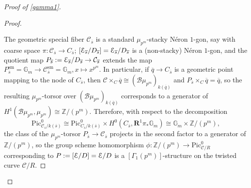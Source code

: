 \documentclass[11pt]{amsart}
\theoremstyle{definition}
\begin{document}
\begin{proof}[Proof of \ref{gamma1}]
\begin{proof}
\begin{center}
\end{center}
The geometric special fiber ${\mathcal{C}}_{\overline{s}}$ is a standard $\mu_{p^m}$-stacky N\'eron $1$-gon, say with coarse space $\pi: {\mathcal{C}}_{\overline{s}} \rightarrow C_{\overline{s}}$; $[{\mathbf{\EuScript{E}}}_{\overline{s}}/D_{\overline{s}}] = {\mathbf{\EuScript{E}}}_{\overline{s}} /D_{\overline{s}}$ is a (non-stacky) N\'eron $1$-gon, and the quotient map $P_{\overline{s}} := {\mathbf{\EuScript{E}}}_{\overline{s}} /D_{\overline{s}} \rightarrow {\mathcal{C}}_{\overline{s}}$ extends the map $P_{\overline{s}}^{\mathrm{sm}} = \mathbb{G}_m \rightarrow {\mathcal{C}}_{\overline{s}}^{\mathrm{sm}} = \mathbb{G}_m,x\mapsto x^{p^m}$. In particular, if $\overline{q} \rightarrow C_{\overline{s}}$ is a geometric point mapping to the node of $C_{\overline{s}}$, then ${\mathcal{C}}\times_C \overline{q} \cong ({\mathcal{B}}\mu_{p^m})_{k(\overline{q})}$ and $P_{\overline{s}}\times_C \overline{q} = \overline{q}$, so the resulting $\mu_{p^m}$-torsor over $({\mathcal{B}}\mu_{p^m})_{k(\overline{q})}$ corresponds to a generator of $H^1({\mathcal{B}}\mu_{p^m}, \mu_{p^m}) \cong \mathbb{Z}/(p^m)$. Therefore, with respect to the decomposition 
\begin{displaymath}
\mathrm{Pic}^0_{{\mathcal{C}}_{\overline{s}}/k(\overline{s})} \cong \mathrm{Pic}^0_{C_{\overline{s}}/k(\overline{s})} \times H^0 (C_{\overline{s}}, \mathbf{R}^1\pi_* \mathbb{G}_m) \cong \mathbb{G}_m \times \mathbb{Z}/(p^m),
\end{displaymath}
the class of the $\mu_{p^m}$-torsor $P_{\overline{s}} \rightarrow {\mathcal{C}}_{\overline{s}}$ projects in the second factor to a generator of $\mathbb{Z}/(p^m)$, so the group scheme homomorphism $\phi: \mathbb{Z}/(p^m) \rightarrow \mathrm{Pic}^0_{{\mathcal{C}}/R}$ corresponding to $P := [{\mathbf{\EuScript{E}}}/D] = {\mathbf{\EuScript{E}}}/D$ is a $[\Gamma_1(p^m)]$-structure on the twisted curve ${\mathcal{C}}/R$.


\end{proof}
\end{proof}
\end{document}
